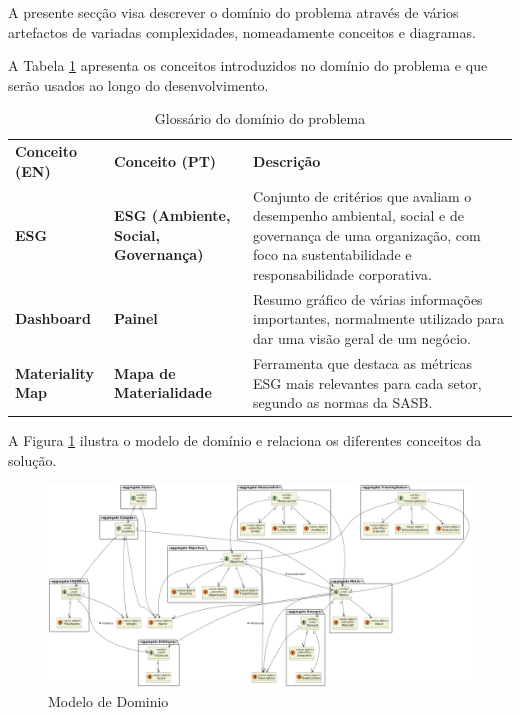 A presente secção visa descrever o domínio do problema através de vários artefactos de variadas complexidades, nomeadamente conceitos e diagramas.

A Tabela \ref{tab:glossario_dominio} apresenta os conceitos introduzidos no domínio do problema e que serão usados ao longo do desenvolvimento.

\begin{table}[H]
    \renewcommand{\arraystretch}{1.2}
    \setlength{\tabcolsep}{10pt}
    \centering
    \begin{tabular}{>{\bfseries}p{3.5cm} >{\bfseries}p{4cm} p{7cm}}
        \rowcolor{purple!40}
        Conceito (EN) & Conceito (PT) & \textbf{Descrição} \\
        ESG & ESG (Ambiente, Social, Governança) & Conjunto de critérios que avaliam o desempenho ambiental, social e de governança de uma organização, com foco na sustentabilidade e responsabilidade corporativa. \\
        Dashboard & Painel & Resumo gráfico de várias informações importantes, normalmente utilizado para dar uma visão geral de um negócio. \\
        Materiality Map & Mapa de Materialidade & Ferramenta que destaca as métricas ESG mais relevantes para cada setor, segundo as normas da SASB. \\
    \end{tabular}
    \caption{Glossário do domínio do problema}
    \label{tab:glossario_dominio}
\end{table}

A Figura \ref{fig:domain_model} ilustra o modelo de domínio e relaciona os diferentes conceitos da solução.

\begin{figure}[h]
    \centering
    \includegraphics[width=\linewidth,keepaspectratio]{frontmatter/assets/diagrams/Domain Model/Domain_Model.png}
    \caption{Modelo de Dominio}
    \label{fig:domain_model}
\end{figure}

